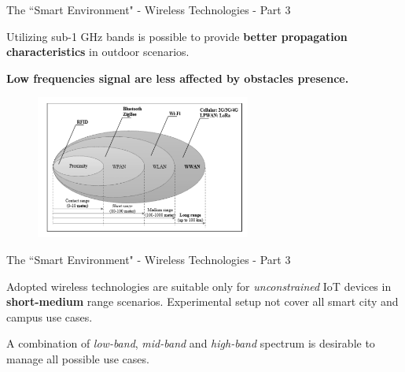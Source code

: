 \documentclass[10pt]{beamer}
\begin{document}
\begin{frame}{The ``Smart Environment" - Wireless Technologies - Part 3}

\begin{block}{}
\justifying
Utilizing sub-1 GHz bands is possible to provide \textbf{better  propagation characteristics} in outdoor scenarios. 

\textbf{Low frequencies signal are less affected by obstacles presence.}
\end{block}

\begin{figure}
  \includegraphics[width=200pt]{class.png}
\end{figure}


\end{frame} 
\begin{frame}{The ``Smart Environment" - Wireless Technologies - Part 3}

\begin{block}{}
\justifying
Adopted wireless technologies are suitable only for \textit{unconstrained} IoT devices in \textbf{short-medium} range scenarios. Experimental setup not cover all smart city and campus use cases.
\end{block}

\begin{block}{}
\justifying
A combination of \textit{low-band}, \textit{mid-band} and \textit{high-band} spectrum is desirable to manage all possible use cases.
\end{block}

\end{frame} 
\end{document}
